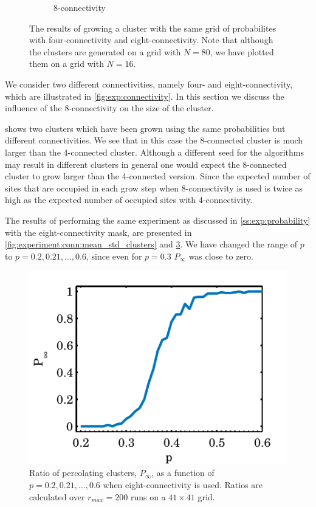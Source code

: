 \begin{figure}[b!]
\begin{subfigure}{0.45\columnwidth}
		\caption{8-connectivity}
		\label{fig:exp:connectivity:eightConnect}
	\end{subfigure}	
	\caption{The results of growing a cluster with the same grid of probabilites with  four-connectivity and  eight-connectivity. Note that although the clusters are generated on a grid with $N = 80$, we have plotted them on a grid with $N = 16$.}
	\label{fig:exp:connectivityResults}
\end{figure}

We consider two different connectivities, namely four- and eight-connectivity, which are illustrated in \cref{fig:exp:connectivity}. In this section we discuss the influence of the 8-connectivity on the size of the cluster.

 shows two clusters which have been grown using the same probabilities but different connectivities. We see that in this case the 8-connected cluster is much larger than the 4-connected cluster. Although a different seed for the algorithms may result in different clusters in general one would expect the 8-connected cluster to grow larger than the 4-connected version. Since the expected number of sites that are occupied in each grow step when 8-connectivity is used is twice as high as the expected number of occupied sites with 4-connectivity. 

The results of performing the same experiment as discussed in \cref{ss:exp:probability} with the eight-connectivity mask, are presented in \cref{fig:experiment:conn:mean_std_clusters} and \ref{fig:experiment:conn:p_inf_ratio}. We have changed the range of $p$ to $p = 0.2, 0.21, \dotsc, 0.6$, since even for $p = 0.3$ $P_\infty$ was close to zero. 

\begin{figure}[b!]
	\centering
	\includegraphics[width=\columnwidth]{./img/assignment_d_p_infinite_ratio_p.pdf}
	\caption{Ratio of percolating clusters, $P_\infty$, as a function of $p = 0.2, 0.21, \dotsc, 0.6$ when eight-connectivity is used. Ratios are calculated over $r_{max} = 200$ runs on a $41 \times 41$ grid.}
	\label{fig:experiment:conn:p_inf_ratio}
\end{figure}


